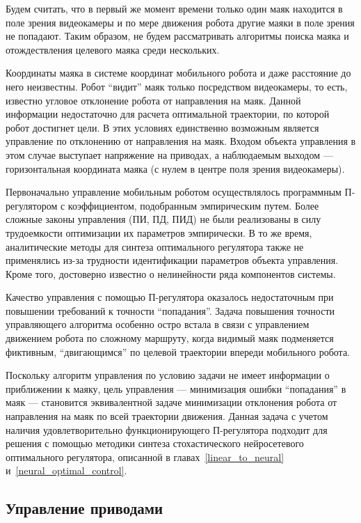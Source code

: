 Будем считать, что в первый же момент времени только один маяк
находится в поле зрения видеокамеры и по мере движения робота другие
маяки в поле зрения не попадают.  Таким образом, не будем
рассматривать алгоритмы поиска маяка и отождествления целевого маяка
среди нескольких.

Координаты маяка в системе координат мобильного робота и даже
расстояние до него неизвестны.  Робот ``видит'' маяк только
посредством видеокамеры, то есть, известно угловое отклонение робота
от направления на маяк.  Данной информации недостаточно для расчета
оптимальной траектории, по которой робот достигнет цели.  В этих
условиях единственно возможным является управление по отклонению от
направления на маяк.  Входом объекта управления в этом случае
выступает напряжение на приводах, а наблюдаемым выходом ---
горизонтальная координата маяка (с нулем в центре поля зрения
видеокамеры).

Первоначально управление мобильным роботом осуществлялось программным
П-ре\-гу\-ля\-то\-ром с коэффициентом, подобранным эмпирическим путем.
Более сложные законы управления (ПИ, ПД, ПИД) не были реализованы в
силу трудоемкости оптимизации их параметров эмпирически.  В то же
время, аналитические методы для синтеза оптимального регулятора также
не применялись из-за трудности идентификации параметров объекта
управления.  Кроме того, достоверно известно о нелинейности ряда
компонентов системы.

Качество управления с помощью П-регулятора оказалось недостаточным при
повышении требований к точности ``попадания''.  Задача повышения
точности управляющего алгоритма особенно остро встала в связи с
управлением движением робота по сложному маршруту, когда видимый маяк
подменяется фиктивным, ``двигающимся'' по целевой траектории впереди
мобильного робота.

Поскольку алгоритм управления по условию задачи не имеет информации о
приближении к маяку, цель управления --- минимизация ошибки
``попадания'' в маяк --- становится эквивалентной задаче минимизации
отклонения робота от направления на маяк по всей траектории движения.
Данная задача с учетом наличия удовлетворительно функционирующего
П-регулятора подходит для решения с помощью методики синтеза
стохастического нейросетевого оптимального регулятора, описанной
в главах~\ref{linear_to_neural} и~\ref{neural_optimal_control}.

\subsection{Управление приводами}

